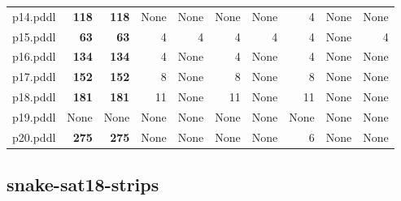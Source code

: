 \documentclass{article}
\begin{document}
\begin{tabular}{@{}lrrrrrrrrr@{}}
p14.pddl & \textbf{118} & \textbf{118} & \multicolumn{1}{|l|}{None} & \multicolumn{1}{|l|}{None} & \multicolumn{1}{|l|}{None} & \multicolumn{1}{|l|}{None} & 4 & \multicolumn{1}{|l|}{None} & \multicolumn{1}{|l|}{None} \\
p15.pddl & \textbf{63} & \textbf{63} & 4 & 4 & 4 & 4 & 4 & \multicolumn{1}{|l|}{None} & 4 \\
p16.pddl & \textbf{134} & \textbf{134} & 4 & \multicolumn{1}{|l|}{None} & 4 & \multicolumn{1}{|l|}{None} & 4 & \multicolumn{1}{|l|}{None} & \multicolumn{1}{|l|}{None} \\
p17.pddl & \textbf{152} & \textbf{152} & 8 & \multicolumn{1}{|l|}{None} & 8 & \multicolumn{1}{|l|}{None} & 8 & \multicolumn{1}{|l|}{None} & \multicolumn{1}{|l|}{None} \\
p18.pddl & \textbf{181} & \textbf{181} & 11 & \multicolumn{1}{|l|}{None} & 11 & \multicolumn{1}{|l|}{None} & 11 & \multicolumn{1}{|l|}{None} & \multicolumn{1}{|l|}{None} \\
p19.pddl & \multicolumn{1}{|l|}{None} & \multicolumn{1}{|l|}{None} & \multicolumn{1}{|l|}{None} & \multicolumn{1}{|l|}{None} & \multicolumn{1}{|l|}{None} & \multicolumn{1}{|l|}{None} & \multicolumn{1}{|l|}{None} & \multicolumn{1}{|l|}{None} & \multicolumn{1}{|l|}{None} \\
p20.pddl & \textbf{275} & \textbf{275} & \multicolumn{1}{|l|}{None} & \multicolumn{1}{|l|}{None} & \multicolumn{1}{|l|}{None} & \multicolumn{1}{|l|}{None} & 6 & \multicolumn{1}{|l|}{None} & \multicolumn{1}{|l|}{None} \\
\end{tabular}

\hypertarget{initial_h_value-snake-sat18-strips}{}
\subsection*{snake-sat18-strips}
\end{document}
